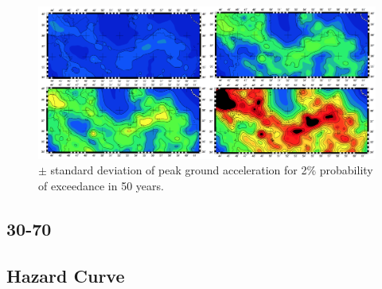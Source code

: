 \begin{figure} [!ht]
\centering
\includegraphics[scale=0.15]{figures/pdf/pga_2_minus_plus.pdf} 
\caption{$\pm$ standard deviation of peak ground acceleration for 2\% probability of exceedance in 50 years.}
\label{fig:pga_2_minus_plus}
\end{figure}



\subsection{30-70}

\subsection{Hazard Curve}
